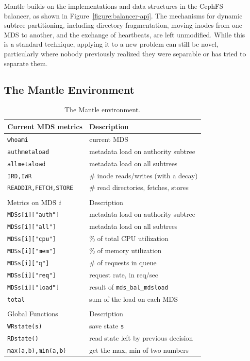 Mantle builds on the implementations and data structures in the CephFS balancer, as shown in Figure~\ref{figure:balancer-api}. The mechanisms for dynamic subtree partitioning, including directory fragmentation, moving inodes from one MDS to another, and the exchange of heartbeats, are left unmodified. While this is a standard technique, applying it to a new problem can still be novel, particularly where nobody previously realized they were separable or has tried to separate them.

\subsection{The Mantle Environment}
\label{the-mantle-environment}
\begin{table}[tb]
	\centering
	\begin{tabular}{ >{}p{3.1cm} | >{}p{5.1cm}}
    	\centering Current MDS metrics
		& \centering Description
		\tabularnewline\hline	
		\small\texttt{whoami}
		& current MDS 
		\tabularnewline
		\small\texttt{authmetaload}
		& metadata load on authority subtree
		\tabularnewline	        
		\small\texttt{allmetaload}
		& metadata load on all subtrees
		\tabularnewline	     
		\small\texttt{IRD,IWR}
		& \# inode reads/writes (with a decay)
		\tabularnewline
		\small\texttt{READDIR,FETCH,STORE}
		& \# read directories, fetches, stores
		\tabularnewline	                
        \multicolumn{2}{c}{}
        \tabularnewline
       
		\centering Metrics on MDS {\it i}
		& \centering Description
		\tabularnewline\hline       
		\small\texttt{MDSs[i]["auth"]}	
		& metadata load on authority subtree
		\tabularnewline			
		\small\texttt{MDSs[i]["all"]}	
		& metadata load on all subtrees
		\tabularnewline	        
		\small\texttt{MDSs[i]["cpu"]}
		& \% of total CPU utilization
		\tabularnewline	
		\small\texttt{MDSs[i]["mem"]}	
		& \% of memory utilization
		\tabularnewline	
		\small\texttt{MDSs[i]["q"]}	
		& \# of requests in queue
		\tabularnewline
		\small\texttt{MDSs[i]["req"]}	
		& request rate, in req/sec
		\tabularnewline				
		\small\texttt{MDSs[i]["load"]}	
		& result of \texttt{mds\_bal\_mdsload}
        \tabularnewline
		\small\texttt{total}
		& sum of the load on each MDS        
        \tabularnewline
        \multicolumn{2}{c}{}
        \tabularnewline
        
		\centering Global Functions
		& \centering Description
		\tabularnewline\hline	 
		\small\texttt{WRstate(s)}
		& save state \texttt{s}
        \tabularnewline
        \small\texttt{RDstate()}	
		& read state left by previous decision
        \tabularnewline
        \small\texttt{max(a,b),min(a,b)}
        & get the max, min of two numbers
	\end{tabular}
	\caption{The Mantle environment.\label{table:metrics}}    
\end{table}
